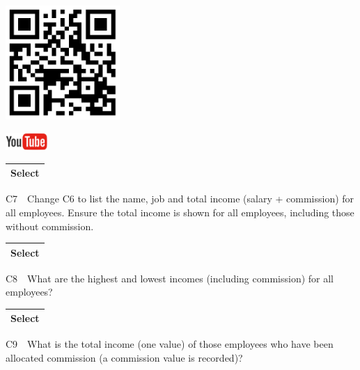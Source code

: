 \begin{center}
\begin{minipage}{4.849cm}
   
\includegraphics[width=4.341cm,height=4.341cm]{images/img (33).png}
 

   
\includegraphics[width=1.582cm,height=0.674cm]{images/img (15).png}
 
\end{minipage}
\end{center}
\begin{flushleft}
\tablefirsthead{}
\tablehead{}
\tabletail{}
\tablelasttail{}
\begin{supertabular}{|m{11.142cm}|}
\hline
Select

\\\hline
\end{supertabular}
\end{flushleft}
C7\ \ Change C6 to list the name, job and total income (salary + commission) for all employees.  Ensure the total income is shown for all employees, including those without commission.

\begin{flushleft}
\tablefirsthead{}
\tablehead{}
\tabletail{}
\tablelasttail{}
\begin{supertabular}{|m{11.08cm}|}
\hline
Select

\\\hline
\end{supertabular}
\end{flushleft}
C8\ \ What are the highest and lowest incomes (including commission) for all employees?

\begin{flushleft}
\tablefirsthead{}
\tablehead{}
\tabletail{}
\tablelasttail{}
\begin{supertabular}{|m{14.583cm}|}
\hline
Select

\\\hline
\end{supertabular}
\end{flushleft}
C9\ \ What is the total income (one value) of those employees who have been allocated commission (a commission value is recorded)?

